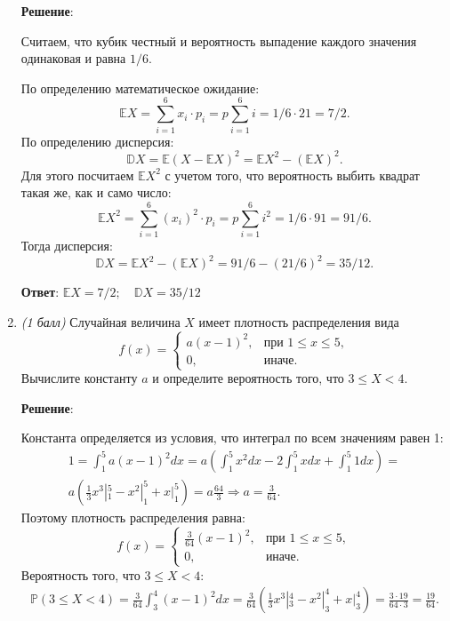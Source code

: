 \documentclass{article}
\begin{document}
\begin{enumerate}
\textbf{Решение}:

Считаем, что кубик честный и вероятность выпадение каждого значения одинаковая и равна $1/6$.

По определению математическое ожидание:
\begin{equation}
    \mathbb{E}X = \sum_{i=1}^{6} x_i \cdot p_i = p \sum_{i=1}^{6} i = 1/6 \cdot 21 = 7/2.
\end{equation}
По определению дисперсия:
\begin{equation}
    \mathbb{D}X = \mathbb{E}(X-\mathbb{E}X)^2 = \mathbb{E}X^2 - (\mathbb{E}X)^2.
\end{equation}
Для этого посчитаем $\mathbb{E}X^2$ с учетом того, что вероятность выбить квадрат такая же, как и само число:
\begin{equation}
    \mathbb{E}X^2 = \sum_{i=1}^{6} (x_i)^2 \cdot p_i = p \sum_{i=1}^{6} i^2 = 1/6 \cdot 91 = 91/6.
\end{equation}
Тогда дисперсия:
\begin{equation}
    \mathbb{D}X = \mathbb{E}X^2 - (\mathbb{E}X)^2 = 91/6 - (21/6)^2 = 35/12.
\end{equation}

\textbf{Ответ}:
$\mathbb{E}X = 7/2; \quad \mathbb{D}X = 35/12$

\item \textit{(1 балл)} Случайная величина $X$ имеет плотность распределения вида
$$f(x)=
\begin{cases}
   a(x-1)^2, &\text{при } 1\leq x\leq5,\\
   0, &\text{иначе}.
 \end{cases}$$
Вычислите константу $a$ и определите вероятность того, что $3\leq X<4$.

\textbf{Решение}:

Константа определяется из условия, что интеграл по всем значениям равен 1:
\begin{eqnarray}
    1 = \int_{1}^{5} a(x-1)^2 dx = a\left(\int_{1}^{5}x^2 dx - 2\int_{1}^{5}x dx + \int_{1}^{5}1 dx\right) = \\
    a\left(\frac{1}{3}x^3|_1^5 - x^2|_1^5 + x|_1^5\right) = a \frac{64}{3} \Rightarrow a = \frac{3}{64}.
\end{eqnarray}
Поэтому плотность распределения равна:
\begin{equation}
    f(x)= \begin{cases}
        \frac{3}{64}(x-1)^2, &\text{при } 1\leq x\leq5,\\
        0, &\text{иначе}.
 \end{cases}
\end{equation}
Вероятность того, что $3\leq X<4$:
\begin{eqnarray}
    \mathbb{P}(3\leq X<4) = \frac{3}{64}\int_{3}^{4}(x-1)^2 dx = \frac{3}{64}\left(\frac{1}{3}x^3|_3^4 - x^2|_3^4 + x|_3^4\right) = \frac{3 \cdot 19}{64 \cdot 3} = \frac{19}{64}.
\end{eqnarray}


\end{enumerate}
\end{document}
